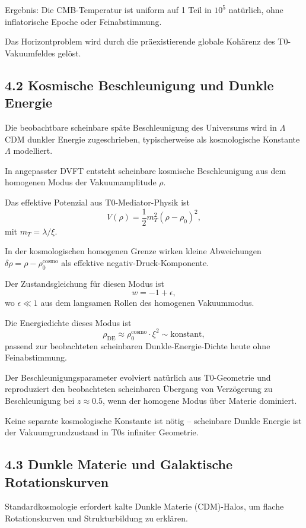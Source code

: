 \documentclass[12pt,a4paper]{article}
\begin{document}
	Ergebnis: Die CMB-Temperatur ist uniform auf 1 Teil in $10^5$ natürlich, ohne inflatorische Epoche oder Feinabstimmung.
	
	Das Horizontproblem wird durch die präexistierende globale Kohärenz des T0-Vakuumfeldes gelöst.
	
	\subsection{4.2 Kosmische Beschleunigung und Dunkle Energie}
	
	Die beobachtbare scheinbare späte Beschleunigung des Universums wird in $\Lambda$CDM dunkler Energie zugeschrieben, typischerweise als kosmologische Konstante $\Lambda$ modelliert.
	
	In angepasster DVFT entsteht scheinbare kosmische Beschleunigung aus dem homogenen Modus der Vakuumamplitude $\rho$.
	
	Das effektive Potenzial aus T0-Mediator-Physik ist
	\[
	V(\rho) = \frac{1}{2} m_T^2 (\rho - \rho_0)^2,
	\]
	mit $m_T = \lambda / \xi$.
	
	In der kosmologischen homogenen Grenze wirken kleine Abweichungen $\delta \rho = \rho - \rho_0^{\text{cosmo}}$ als effektive negativ-Druck-Komponente.
	
	Der Zustandsgleichung für diesen Modus ist
	\[
	w = -1 + \epsilon,
	\]
	wo $\epsilon \ll 1$ aus dem langsamen Rollen des homogenen Vakuummodus.
	
	Die Energiedichte dieses Modus ist
	\[
	\rho_{\text{DE}} \approx \rho_0^{\text{cosmo}} \cdot \xi^2 \sim \text{konstant},
	\]
	passend zur beobachteten scheinbaren Dunkle-Energie-Dichte heute ohne Feinabstimmung.
	
	Der Beschleunigungsparameter evolviert natürlich aus T0-Geometrie und reproduziert den beobachteten scheinbaren Übergang von Verzögerung zu Beschleunigung bei $z \approx 0.5$, wenn der homogene Modus über Materie dominiert.
	
	Keine separate kosmologische Konstante ist nötig – scheinbare Dunkle Energie ist der Vakuumgrundzustand in T0s infiniter Geometrie.
	
	\subsection{4.3 Dunkle Materie und Galaktische Rotationskurven}
	
	Standardkosmologie erfordert kalte Dunkle Materie (CDM)-Halos, um flache Rotationskurven und Strukturbildung zu erklären.
	
\end{document}
